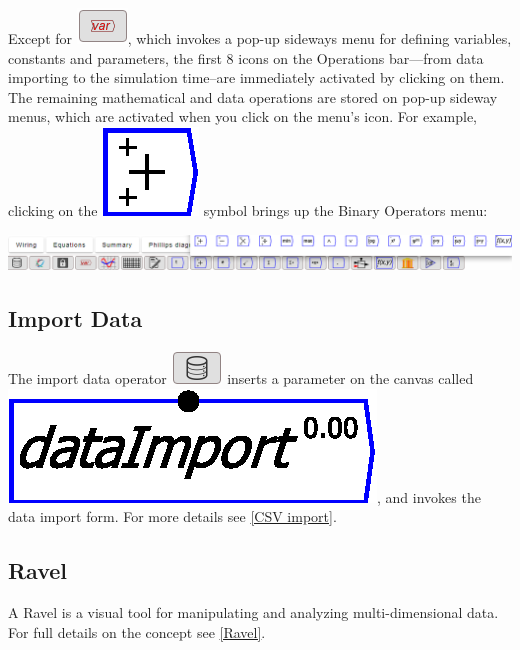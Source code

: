 Except for \includegraphics{images/var}, which invokes a pop-up sideways
menu for defining variables, constants and parameters, the first 8
icons on the Operations bar---from data importing to the simulation
time--are immediately activated by clicking on them. The remaining
mathematical and data operations are stored on pop-up sideway menus,
which are activated when you click on the menu's icon. For example,
clicking on the \includegraphics{images/Plus} symbol brings up the
Binary Operators menu:

\includegraphics{images/DesignIconsWithBinaryOperatorsMenu}

\subsection{Import Data}

The import data operator \includegraphics{images/ImportWidget} inserts
a parameter on the canvas called \includegraphics{images/dataImport},
and invokes the data import form. For more details see \ref{CSV import}.

\subsection{Ravel}

A Ravel is a visual tool for manipulating and analyzing multi-dimensional
data. For full details on the concept see \ref{Ravel}.

